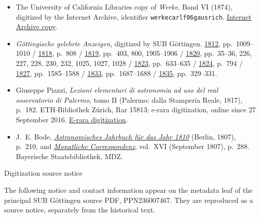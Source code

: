 \begin{itemize}
\item The University of California Libraries copy of \emph{Werke}, Band VI (1874), digitized by the Internet Archive, identifier \texttt{werkecarlf06gausrich}.
\href{https://archive.org/details/werkecarlf06gausrich}{Internet Archive copy}.
\item \emph{Göttingische gelehrte Anzeigen}, digitized by SUB Göttingen. \href{https://resolver.sub.uni-goettingen.de/purl?PPN319721507_1812}{1812}, pp.~1009--1010 / \href{https://resolver.sub.uni-goettingen.de/purl?PPN319721507_1818}{1818}, p.~808 / \href{https://resolver.sub.uni-goettingen.de/purl?PPN319721507_1819}{1819}, pp.~403, 800, 1905--1906 / \href{https://resolver.sub.uni-goettingen.de/purl?PPN319721507_1820}{1820}, pp.~35--36, 226, 227, 228, 230, 232, 1025, 1027, 1028 / \href{https://resolver.sub.uni-goettingen.de/purl?PPN385030444_1823_1}{1823}, pp.~633--635 / \href{https://resolver.sub.uni-goettingen.de/purl?PPN385030444_1824_2}{1824}, p.~794 / \href{https://resolver.sub.uni-goettingen.de/purl?PPN319721507_1827}{1827}, pp.~1585--1588 / \href{https://resolver.sub.uni-goettingen.de/purl?PPN385030444_1833_2}{1833}, pp.~1687--1688 / \href{https://resolver.sub.uni-goettingen.de/purl?PPN385030444_1835_1}{1835}, pp.~329--331.
\item Giuseppe Piazzi, \emph{Lezioni elementari di astronomia ad uso del real osservatorio di Palermo}, tomo II (Palermo: dalla Stamperia Reale, 1817), p.~182. ETH-Bibliothek Zürich, Rar 15813; e-rara digitization, online since 27 September 2016.
\href{https://doi.org/10.3931/e-rara-49276}{E-rara digitization}.
\item J.~E. Bode, \href{https://www.digitale-sammlungen.de/en/view/bsb10538437?page=218}{\emph{Astronomisches Jahrbuch für das Jahr 1810}} (Berlin, 1807), p.~210, and \href{https://www.digitale-sammlungen.de/en/view/bsb10538607?page=302}{\emph{Monatliche Correspondenz}}, vol.~XVI (September 1807), p.~288. Bayerische Staatsbibliothek, MDZ.
\end{itemize}

\clearpage
{}
\begin{center}
{\Large Digitization source notice}
\end{center}

The following notice and contact information appear on the metadata leaf of the principal SUB Göttingen source PDF, PPN236007467. They are reproduced as a source notice, separately from the historical text.

